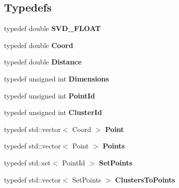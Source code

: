 \subsection*{Typedefs}
\begin{DoxyCompactItemize}
\item 
typedef double {\bfseries S\+V\+D\+\_\+\+F\+L\+O\+AT}\hypertarget{namespacekukadu_a225d072f876e31ab3a357d59ce8d0149}{}\label{namespacekukadu_a225d072f876e31ab3a357d59ce8d0149}

\item 
typedef double {\bfseries Coord}\hypertarget{namespacekukadu_a53d736e9108e87316673bcfcd8226780}{}\label{namespacekukadu_a53d736e9108e87316673bcfcd8226780}

\item 
typedef double {\bfseries Distance}\hypertarget{namespacekukadu_ae1cbcb147e3dc5064880320c2c9b6dc7}{}\label{namespacekukadu_ae1cbcb147e3dc5064880320c2c9b6dc7}

\item 
typedef unsigned int {\bfseries Dimensions}\hypertarget{namespacekukadu_a728df7f207a3c6b0dfd28d7dd546e5f5}{}\label{namespacekukadu_a728df7f207a3c6b0dfd28d7dd546e5f5}

\item 
typedef unsigned int {\bfseries Point\+Id}\hypertarget{namespacekukadu_a02d2fa18ebd7965d7ec4810719c97deb}{}\label{namespacekukadu_a02d2fa18ebd7965d7ec4810719c97deb}

\item 
typedef unsigned int {\bfseries Cluster\+Id}\hypertarget{namespacekukadu_abd5fe11abfe2df8520174c32f6f2a67b}{}\label{namespacekukadu_abd5fe11abfe2df8520174c32f6f2a67b}

\item 
typedef std\+::vector$<$ Coord $>$ {\bfseries Point}\hypertarget{namespacekukadu_ae56bf75d832d53ac502efb8a21c22144}{}\label{namespacekukadu_ae56bf75d832d53ac502efb8a21c22144}

\item 
typedef std\+::vector$<$ Point $>$ {\bfseries Points}\hypertarget{namespacekukadu_a031e9cd069e03edfe2dbb746610e8d17}{}\label{namespacekukadu_a031e9cd069e03edfe2dbb746610e8d17}

\item 
typedef std\+::set$<$ Point\+Id $>$ {\bfseries Set\+Points}\hypertarget{namespacekukadu_a8e379b5b193ab8a74ca7b690c2831f74}{}\label{namespacekukadu_a8e379b5b193ab8a74ca7b690c2831f74}

\item 
typedef std\+::vector$<$ Set\+Points $>$ {\bfseries Clusters\+To\+Points}\hypertarget{namespacekukadu_af2a88faeb228f7b67112e994a3db8179}{}\label{namespacekukadu_af2a88faeb228f7b67112e994a3db8179}


\end{DoxyCompactItemize}
